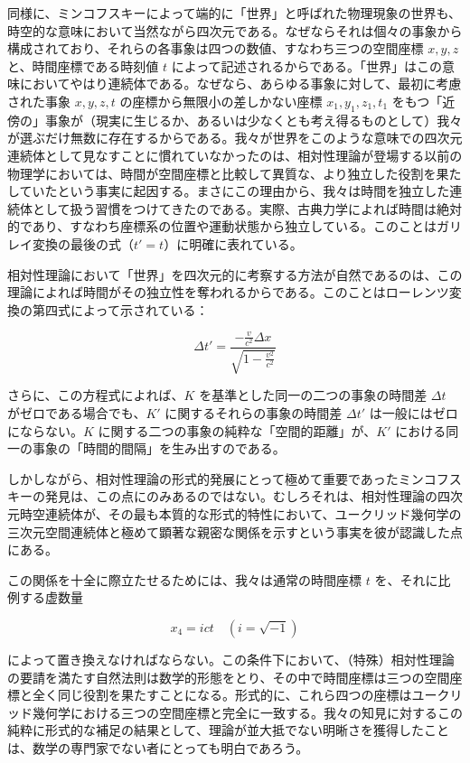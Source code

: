 \documentclass[a4paper,11pt,openany]{ltjsbook}
\begin{document}
同様に、ミンコフスキーによって端的に「世界」と呼ばれた物理現象の世界も、時空的な意味において当然ながら四次元である。なぜならそれは個々の事象から構成されており、それらの各事象は四つの数値、すなわち三つの空間座標 $x, y, z$ と、時間座標である時刻値 $t$ によって記述されるからである。「世界」はこの意味においてやはり連続体である。なぜなら、あらゆる事象に対して、最初に考慮された事象 $x, y, z, t$ の座標から無限小の差しかない座標 $x_1, y_1, z_1, t_1$ をもつ「近傍の」事象が（現実に生じるか、あるいは少なくとも考え得るものとして）我々が選ぶだけ無数に存在するからである。我々が世界をこのような意味での四次元連続体として見なすことに慣れていなかったのは、相対性理論が登場する以前の物理学においては、時間が空間座標と比較して異質な、より独立した役割を果たしていたという事実に起因する。まさにこの理由から、我々は時間を独立した連続体として扱う習慣をつけてきたのである。実際、古典力学によれば時間は絶対的であり、すなわち座標系の位置や運動状態から独立している。このことはガリレイ変換の最後の式（$t' = t$）に明確に表れている。

相対性理論において「世界」を四次元的に考察する方法が自然であるのは、この理論によれば時間がその独立性を奪われるからである。このことはローレンツ変換の第四式によって示されている：



\[ \Delta t' = \frac{- \frac{v}{c^2} \Delta x}{\sqrt{1 - \frac{v^2}{c^2}}} \]



さらに、この方程式によれば、$K$ を基準とした同一の二つの事象の時間差 $\Delta t$ がゼロである場合でも、$K'$ に関するそれらの事象の時間差 $\Delta t'$ は一般にはゼロにならない。$K$ に関する二つの事象の純粋な「空間的距離」が、$K'$ における同一の事象の「時間的間隔」を生み出すのである。

しかしながら、相対性理論の形式的発展にとって極めて重要であったミンコフスキーの発見は、この点にのみあるのではない。むしろそれは、相対性理論の四次元時空連続体が、その最も本質的な形式的特性において、ユークリッド幾何学の三次元空間連続体と極めて顕著な親密な関係を示すという事実を彼が認識した点にある。

この関係を十全に際立たせるためには、我々は通常の時間座標 $t$ を、それに比例する虚数量



\[ x_4 = i c t \quad (i = \sqrt{-1}) \]



によって置き換えなければならない。この条件下において、（特殊）相対性理論の要請を満たす自然法則は数学的形態をとり、その中で時間座標は三つの空間座標と全く同じ役割を果たすことになる。形式的に、これら四つの座標はユークリッド幾何学における三つの空間座標と完全に一致する。我々の知見に対するこの純粋に形式的な補足の結果として、理論が並大抵でない明晰さを獲得したことは、数学の専門家でない者にとっても明白であろう。
\end{document}
